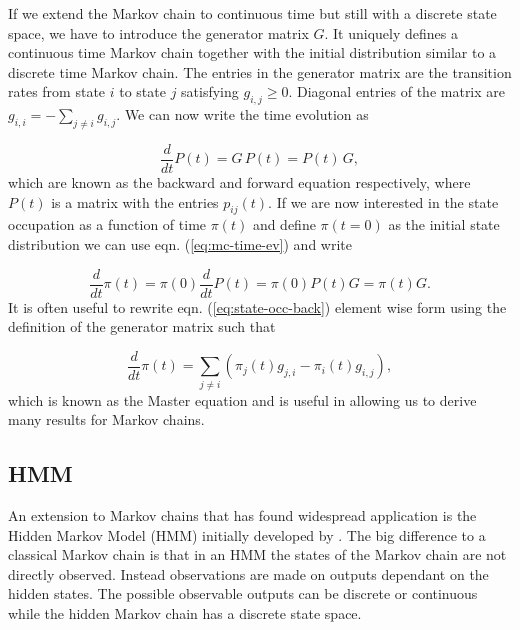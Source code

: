 If we extend the Markov chain to continuous time but still with a discrete state space, we have to introduce the generator matrix $G$. It uniquely defines a continuous time Markov chain together with the initial distribution similar to a  discrete time Markov chain. The entries in the generator matrix are the transition rates from state $i$ to state $j$ satisfying $g_{i,j} \geq 0$. Diagonal entries of the matrix are $g_{i,i} = - \sum_{j \neq i} g_{i,j}$. We can now write the time evolution as

\begin{equation}
  \label{eq:mc-time-ev}
  \frac{d}{dt} P(t) = G\, P(t) = P(t)\, G,
\end{equation}
which are known as the backward and forward equation respectively, where $P(t)$ is a matrix with the entries $p_{ij}(t)$. If we are now interested in the state occupation as a function of time $\pi(t)$ and define $\pi(t=0)$ as the initial state distribution we can use eqn. (\ref{eq:mc-time-ev}) and write

\begin{equation}
  \label{eq:state-occ-back}
  \frac{d}{dt}\pi(t) = \pi(0) \frac{d}{dt} P(t) = \pi(0) P(t) G = \pi(t)G.
\end{equation}
It is often useful to rewrite eqn. (\ref{eq:state-occ-back}) element wise form using the definition of the generator matrix such that

\begin{equation}
  \label{eq:mc-master}
  \frac{d}{dt} \pi (t) = \sum_{j\neq i} \left( \pi_j(t)g_{j,i} - \pi_i(t)g_{i,j} \right),
\end{equation}
which is known as the Master equation and is useful in allowing us to derive many results for Markov chains.

\subsection{HMM}
\label{sec:hmm}

An extension to Markov chains that has found widespread application is the Hidden Markov Model (HMM) initially developed by \cite{Baum:1966cy}. The big difference to a classical Markov chain is that in an HMM the states of the Markov chain are not directly observed. Instead observations are made on outputs dependant on the hidden states. The possible observable outputs can be discrete or continuous while the hidden Markov chain has a discrete state space.

